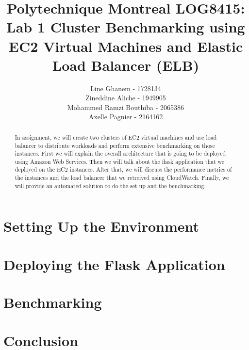 \documentclass{article}
\title{Polytechnique Montreal
LOG8415: Lab 1
Cluster Benchmarking using EC2 Virtual
Machines and Elastic Load Balancer (ELB)}
\author{Line Ghanem - 1728134\\Zineddine Aliche - 1949905\\
Mohammed Ramzi Bouthiba - 2065386\\Axelle Pagnier - 2164162}
\begin{document}
\maketitle

\begin{abstract}
In	assignment,	we	will	create	two	clusters of	EC2 virtual	machines and use	load	balancer	to	distribute	workloads	and	perform	extensive	benchmarking	on	those instances.\newline
First we will explain the overall architecture that is going to be deployed using Amazon Web Services. Then we will talk about the flask application that we deployed on the EC2 instances. After that, we will discuss the performance metrics of the instances and the load balancer that we retreived using CloudWatch.	Finally, we will provide an automated solution to do the set up and the benchmarking.
\end{abstract}

\section{Setting Up the Environment}
\section{Deploying the Flask Application}
\section{Benchmarking}
\section{Conclusion}
\end{document}

